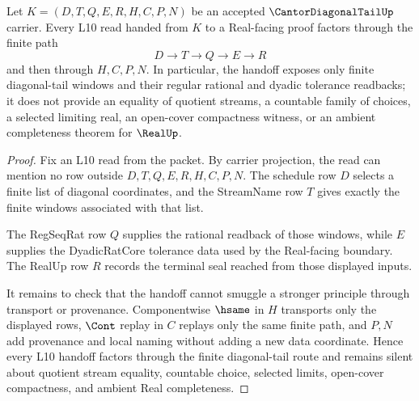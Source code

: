 \begin{theorem}
\label{thm:cantor-diagonal-tail-l10-handoff}
Let $K=(D,T,Q,E,R,H,C,P,N)$ be an accepted $\CantorDiagonalTailUp$ carrier. Every L10 read handed from $K$ to a Real-facing proof factors through the finite path
$$
D \longrightarrow T \longrightarrow Q \longrightarrow E \longrightarrow R
$$
and then through $H,C,P,N$. In particular, the handoff exposes only finite diagonal-tail windows and their regular rational and dyadic tolerance readbacks; it does not provide an equality of quotient streams, a countable family of choices, a selected limiting real, an open-cover compactness witness, or an ambient completeness theorem for $\RealUp$.
\end{theorem}
\begin{proof}
Fix an L10 read from the packet. By carrier projection, the read can mention no row outside $D,T,Q,E,R,H,C,P,N$. The schedule row $D$ selects a finite list of diagonal coordinates, and the StreamName row $T$ gives exactly the finite windows associated with that list.

The RegSeqRat row $Q$ supplies the rational readback of those windows, while $E$ supplies the DyadicRatCore tolerance data used by the Real-facing boundary. The RealUp row $R$ records the terminal seal reached from those displayed inputs.

It remains to check that the handoff cannot smuggle a stronger principle through transport or provenance. Componentwise $\hsame$ in $H$ transports only the displayed rows, $\Cont$ replay in $C$ replays only the same finite path, and $P,N$ add provenance and local naming without adding a new data coordinate. Hence every L10 handoff factors through the finite diagonal-tail route and remains silent about quotient stream equality, countable choice, selected limits, open-cover compactness, and ambient Real completeness.
\end{proof}



